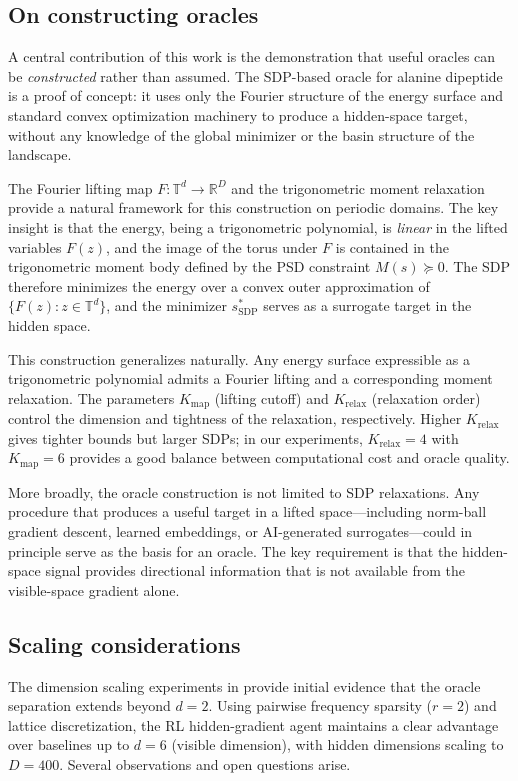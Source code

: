 \documentclass[10pt]{article}
\theoremstyle{definition}
\newcommand{\R}{\mathbb{R}}
\newcommand{\T}{\mathbb{T}}
\newcommand{\sdp}{\mathrm{SDP}}
\begin{document}
\subsection{On constructing oracles}

A central contribution of this work is the demonstration that useful oracles can be \emph{constructed} rather than assumed. The SDP-based oracle for alanine dipeptide is a proof of concept: it uses only the Fourier structure of the energy surface and standard convex optimization machinery to produce a hidden-space target, without any knowledge of the global minimizer or the basin structure of the landscape.

The Fourier lifting map $F: \T^d \to \R^D$ and the trigonometric moment relaxation provide a natural framework for this construction on periodic domains. The key insight is that the energy, being a trigonometric polynomial, is \emph{linear} in the lifted variables $F(z)$, and the image of the torus under $F$ is contained in the trigonometric moment body defined by the PSD constraint $M(s) \succeq 0$. The SDP therefore minimizes the energy over a convex outer approximation of $\{F(z) : z \in \T^d\}$, and the minimizer $s^*_{\sdp}$ serves as a surrogate target in the hidden space.

This construction generalizes naturally. Any energy surface expressible as a trigonometric polynomial admits a Fourier lifting and a corresponding moment relaxation. The parameters $K_{\mathrm{map}}$ (lifting cutoff) and $K_{\mathrm{relax}}$ (relaxation order) control the dimension and tightness of the relaxation, respectively. Higher $K_{\mathrm{relax}}$ gives tighter bounds but larger SDPs; in our experiments, $K_{\mathrm{relax}} = 4$ with $K_{\mathrm{map}} = 6$ provides a good balance between computational cost and oracle quality.

More broadly, the oracle construction is not limited to SDP relaxations. Any procedure that produces a useful target in a lifted space---including norm-ball gradient descent, learned embeddings, or AI-generated surrogates---could in principle serve as the basis for an oracle. The key requirement is that the hidden-space signal provides directional information that is not available from the visible-space gradient alone.

\subsection{Scaling considerations}

The dimension scaling experiments in  provide initial evidence that the oracle separation extends beyond $d = 2$. Using pairwise frequency sparsity ($r = 2$) and lattice discretization, the RL hidden-gradient agent maintains a clear advantage over baselines up to $d = 6$ (visible dimension), with hidden dimensions scaling to $D = 400$. Several observations and open questions arise.
\end{document}
